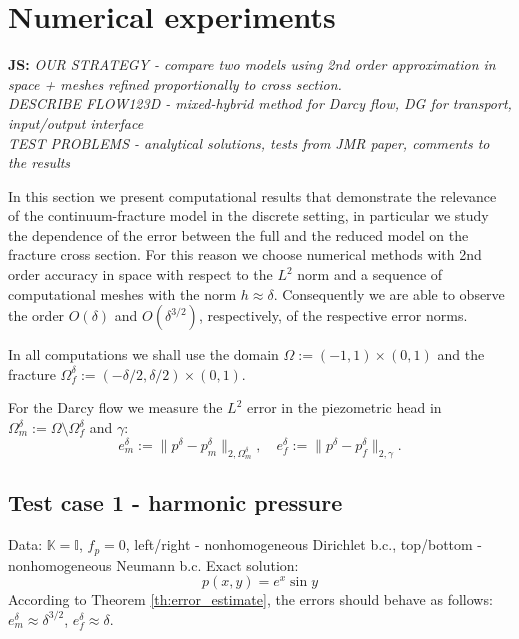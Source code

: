 \documentclass[a4paper]{article}
\def\tn#1{{\mathbb{#1}}}    %
\def\norm#1{\|#1\|}
\newcommand{\note}[2]{{\color{blue} \textbf{ #1:} \textit{#2}}}
\begin{document}
\section{Numerical experiments}
\label{sc:numerics}

\note{JS}{
OUR STRATEGY - compare two models using 2nd order approximation in space + meshes refined proportionally to cross section.
\\
DESCRIBE FLOW123D - mixed-hybrid method for Darcy flow, DG for transport, input/output interface
\\
TEST PROBLEMS - analytical solutions, tests from JMR paper, comments to the results
}

In this section we present computational results that demonstrate the relevance of the continuum-fracture model in the discrete setting, in particular we study the dependence of the error between the full and the reduced model on the fracture cross section.
For this reason we choose numerical methods with 2nd order accuracy in space with respect to the $L^2$ norm and a sequence of computational meshes with the norm $h\approx\delta$. Consequently we are able to observe the order $O(\delta)$ and $O(\delta^{3/2})$, respectively, of the respective error norms.

In all computations we shall use the domain $\Omega:=(-1,1)\times(0,1)$ and the fracture $\Omega_f^\delta:=(-\delta/2,\delta/2)\times(0,1)$.

For the Darcy flow we measure the $L^2$ error in the piezometric head in $\Omega_m^\delta:=\Omega\setminus\Omega_f^\delta$ and $\gamma$:
\[ e_m^\delta := \norm{p^\delta - p_m^\delta}_{2,\Omega_m^\delta},\quad e_f^\delta := \norm{p^\delta - p_f^\delta}_{2,\gamma}. \]


\subsection{Test case 1 - harmonic pressure}

Data: $\tn K=\tn I$, $f_p=0$, left/right - nonhomogeneous Dirichlet b.c., top/bottom - nonhomogeneous Neumann b.c.
Exact solution:
\[ p(x,y) = e^x\sin y \]
According to Theorem \ref{th:error_estimate}, the errors should behave as follows: $e_m^\delta\approx\delta^{3/2}$, $e_f^\delta\approx\delta$.
\end{document}

